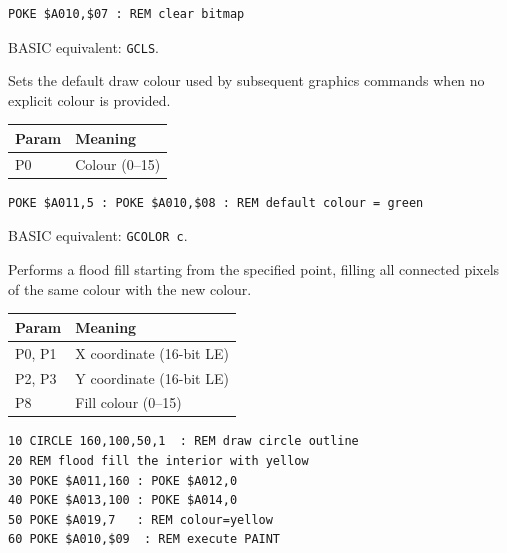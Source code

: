 \begin{lstlisting}
POKE $A010,$07 : REM clear bitmap
\end{lstlisting}

\begin{notebox}
BASIC equivalent: \texttt{GCLS}.
\end{notebox}



Sets the default draw colour used by subsequent graphics commands when no
explicit colour is provided.

\begin{center}
\small
\begin{tabular}{@{}ll@{}}
\toprule
\textbf{Param} & \textbf{Meaning} \\
\midrule
P0 & Colour (0--15) \\
\bottomrule
\end{tabular}
\end{center}

\begin{lstlisting}
POKE $A011,5 : POKE $A010,$08 : REM default colour = green
\end{lstlisting}

\begin{notebox}
BASIC equivalent: \texttt{GCOLOR c}.
\end{notebox}



Performs a flood fill starting from the specified point, filling all
connected pixels of the same colour with the new colour.

\begin{center}
\small
\begin{tabular}{@{}ll@{}}
\toprule
\textbf{Param} & \textbf{Meaning} \\
\midrule
P0, P1 & X coordinate (16-bit LE) \\
P2, P3 & Y coordinate (16-bit LE) \\
P8     & Fill colour (0--15) \\
\bottomrule
\end{tabular}
\end{center}

\begin{lstlisting}
10 CIRCLE 160,100,50,1  : REM draw circle outline
20 REM flood fill the interior with yellow
30 POKE $A011,160 : POKE $A012,0
40 POKE $A013,100 : POKE $A014,0
50 POKE $A019,7   : REM colour=yellow
60 POKE $A010,$09  : REM execute PAINT
\end{lstlisting}

